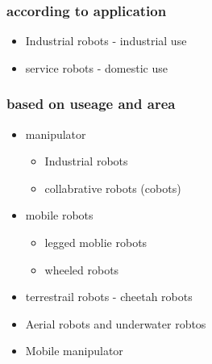 \documentclass{article}
\begin{document}
\subsubsection{according to application}
\begin{itemize}
	\item Industrial robots - industrial use
	\item service robots - domestic use
\end{itemize}
\subsubsection{based on useage and area}
\begin{itemize}
	\item manipulator
	      \begin{itemize}
		      \item Industrial robots
		      \item collabrative robots (cobots)
	      \end{itemize}
	\item mobile robots
	      \begin{itemize}
		      \item legged moblie robots
		      \item wheeled robots
	      \end{itemize}
	\item terrestrail robots - cheetah robots
	\item Aerial robots and underwater robtos
	\item Mobile manipulator
\end{itemize}


\newpage
\end{document}
